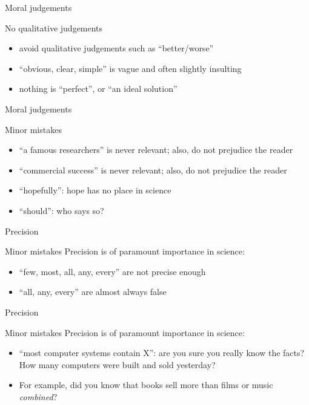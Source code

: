 \documentclass{beamer}
\begin{document}
\begin{frame}{Moral judgements}
\begin{block}{No qualitative judgements}
\begin{itemize}
\item avoid qualitative judgements such as ``better/worse''
\item ``obvious, clear, simple'' is vague and often slightly insulting
\item nothing is ``perfect'', or ``an ideal solution''
\end{itemize}
\end{block}
\end{frame}

\begin{frame}{Moral judgements}
\begin{block}{Minor mistakes}
\begin{itemize}
\item ``a famous researchers'' is never relevant; also, do not prejudice the reader
\item ``commercial success'' is never relevant; also, do not prejudice the reader
\item ``hopefully'': hope has no place in science
\item ``should'': who says so?
\end{itemize}
\end{block}
\end{frame}

\begin{frame}{Precision}
\begin{block}{Minor mistakes}
Precision is of paramount importance in science:
\begin{itemize}
\item ``few, most, all, any, every'' are not precise enough
\item ``all, any, every'' are almost always false
\end{itemize}
\end{block}
\end{frame}

\begin{frame}{Precision}
\begin{block}{Minor mistakes}
Precision is of paramount importance in science:
\begin{itemize}
\item ``most computer systems contain X'': are you sure you really know the facts? How many computers were built and sold yesterday? 
\item For example, did you know that books sell more than films or music \textit{combined}?
\end{itemize}
\end{block}
\end{frame}
\end{document}
